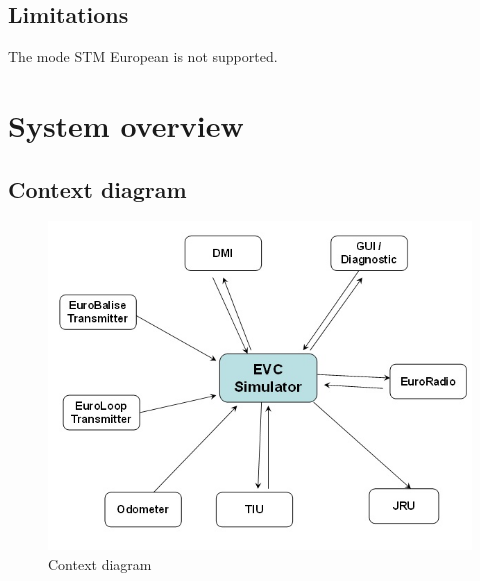 \documentclass[nocc]{template/openetcs_report}
\begin{document}
\section{Limitations}
The mode STM European is not supported.

\chapter{System overview}
\section{Context diagram}
\begin{figure}[!h]
  \centering
  \includegraphics[width=\textwidth]{image/evc_context_diagram}
  \caption{Context diagram}
  \label{fig:Context diagram}
\end{figure}
\end{document}
